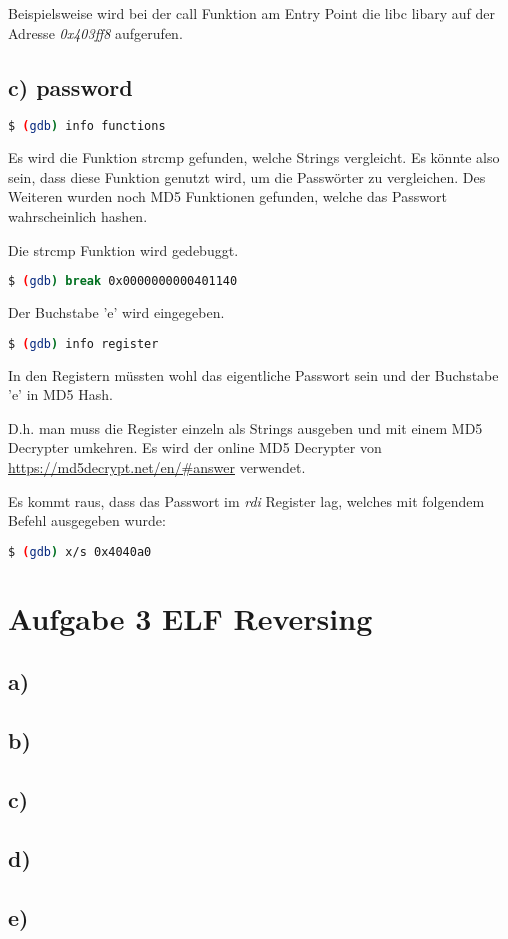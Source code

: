 Beispielsweise wird bei der call Funktion am Entry Point die libc libary auf der Adresse
\textit{0x403ff8} aufgerufen.

\subsection*{c) password}

\begin{lstlisting}[language=bash]
    $ (gdb) info functions
\end{lstlisting}

Es wird die Funktion strcmp gefunden, welche Strings vergleicht. Es könnte also sein, dass
diese Funktion genutzt wird, um die Passwörter zu vergleichen.
Des Weiteren wurden noch MD5 Funktionen gefunden, welche das Passwort wahrscheinlich hashen.

Die strcmp Funktion wird gedebuggt.

\begin{lstlisting}[language=bash]
    $ (gdb) break 0x0000000000401140
\end{lstlisting}

Der Buchstabe 'e' wird eingegeben.

\begin{lstlisting}[language=bash]
    $ (gdb) info register
\end{lstlisting}

In den Registern müssten wohl das eigentliche Passwort sein und der Buchstabe 'e' in MD5 Hash.

D.h. man muss die Register einzeln als Strings ausgeben und mit einem MD5 Decrypter umkehren.
Es wird der online MD5 Decrypter von \url{https://md5decrypt.net/en/#answer} verwendet.

Es kommt raus, dass das Passwort im \textit{rdi} Register lag, welches mit folgendem Befehl ausgegeben wurde:

\begin{lstlisting}[language=bash]
    $ (gdb) x/s 0x4040a0
\end{lstlisting}


\section*{Aufgabe 3 ELF Reversing}

\subsection*{a)}

\subsection*{b)}

\subsection*{c)}

\subsection*{d)}

\subsection*{e)}

